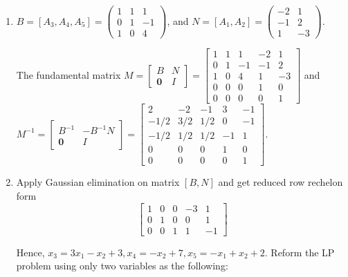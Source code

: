 \documentclass[12pt]{article}
\begin{document}
\begin{enumerate}[label = (\alph*)]
\item 

$B = [A_3, A_4, A_5] = \begin{pmatrix}
1 & 1 & 1\\
0 & 1 & -1 \\
1 & 0 & 4
\end{pmatrix}$, and $N = [A_1, A_2] = \begin{pmatrix}
-2 & 1 \\
-1 & 2 \\
1 & -3
\end{pmatrix}$.

The fundamental matrix $M = \begin{bmatrix}
B & N \\
\textbf{0} & I
\end{bmatrix} = \begin{bmatrix}
1 & 1 & 1 & -2 & 1 \\
0 & 1 & -1 & -1 & 2 \\
1 & 0 & 4 & 1 & -3 \\
0 & 0 & 0 & 1 & 0 \\
0 & 0 & 0 & 0 & 1
\end{bmatrix}$ and $M^{-1} = \begin{bmatrix}
B^{-1} & -B^{-1} N \\
\textbf{0} & I
\end{bmatrix} = \begin{bmatrix}
2 & -2 & -1 & 3 & -1 \\
-1/2 & 3/2 & 1/2 & 0 & -1 \\
-1/2 & 1/2 & 1/2 & -1 & 1 \\
0 & 0 & 0 & 1 & 0 \\                                        
0 & 0 & 0 & 0 & 1
\end{bmatrix}$.

\item

Apply Gaussian elimination on matrix $[B, N]$ and get reduced row rechelon form
$$
\begin{bmatrix}
     1  &   0     &  0  &  -3  &   1 \\
     0  &   1 &    0  &   0  &   1 \\
     0  &   0 &    1  &   1  &  -1
     \end{bmatrix}
$$

Hence, $x_3 = 3x_1 - x_2 + 3, x_4 = -x_2 + 7, x_5 = -x_1 + x_2 + 2 $. Reform the LP problem using only two variables as the following:


\end{enumerate}
\end{document}
